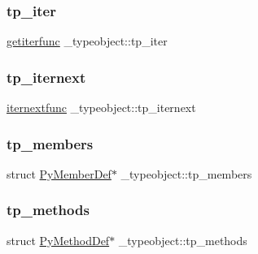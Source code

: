 \subsubsection{\texorpdfstring{tp\_iter}{tp\_iter}}
{\footnotesize\ttfamily \mbox{\hyperlink{_python27_2object_8h_a18ac80dcf45345b226df85368e0ebbd0}{getiterfunc}} \+\_\+typeobject\+::tp\+\_\+iter}

\mbox{\label{struct__typeobject_ac8a504063223b10ac45dc6a4a84f6b91}} 
\subsubsection{\texorpdfstring{tp\_iternext}{tp\_iternext}}
{\footnotesize\ttfamily \mbox{\hyperlink{_python27_2object_8h_ad8bd84ee5cd8ad1a308d4be61b838702}{iternextfunc}} \+\_\+typeobject\+::tp\+\_\+iternext}

\mbox{\label{struct__typeobject_ae35c6aa639013712d8b2852aec6eb5c5}} 
\subsubsection{\texorpdfstring{tp\_members}{tp\_members}}
{\footnotesize\ttfamily struct \mbox{\hyperlink{struct_py_member_def}{Py\+Member\+Def}}$\ast$ \+\_\+typeobject\+::tp\+\_\+members}

\mbox{\label{struct__typeobject_ac5b8ef9ede866f6c6800e704e8c7503b}} 
\subsubsection{\texorpdfstring{tp\_methods}{tp\_methods}}
{\footnotesize\ttfamily struct \mbox{\hyperlink{struct_py_method_def}{Py\+Method\+Def}}$\ast$ \+\_\+typeobject\+::tp\+\_\+methods}

\mbox{\label{struct__typeobject_ad63f55aa467a1b1ef34dd84a4661d294}} 
